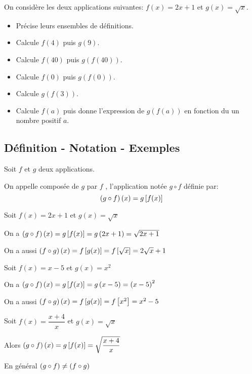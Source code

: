 


  
   \begin{lemma}
    On considère les deux applications suivantes: $ f(x)=2x+1 $  et  $ g(x)=\sqrt{x} $.
  \begin{itemize}
\item  Précise leurs ensembles de définitions.
 \item Calcule $ f(4) $  puis $ g(9) $.
 \item Calcule $ f(40) $  puis $ g(f(40)) $.
 \item Calcule $ f(0) $  puis $ g(f(0)) $.
 \item Calcule  $ g(f(3)) $.
 \item Calcule $ f(a) $  puis donne l'expression de $ g(f(a)) $  en fonction du  un nombre positif $ a $.
 \end{itemize}
 \end{lemma}
\subsection*{Définition - Notation - Exemples}

  \begin{definition}
  Soit $f $ et $g$  deux applications.
 
 On appelle composée de $ g $  par $ f $ , l'application notée $ g\circ f $ définie par:
  \[\left(g\circ f\right)(x)=g\left[ f(x) \right]\]
 \end{definition}
 
  \begin{example}
  Soit $ f(x)= 2x+1 $  et $ g(x)=\sqrt{x} $

 
 On a $ \left(g\circ f\right)(x)=g\left[ f(x) \right]= g\left(2x+1\right)=\sqrt{2x+1} $
 


  On a aussi $ \left(f\circ g\right)(x)=f\left[ g(x) \right]= f\left[ \sqrt{x} \right]=2\sqrt{x}+1 $
  \end{example}

  \begin{example}
 
 Soit $ f(x)= x-5 $  et $ g(x)=x^{2} $
 
 
 On a $ \left(g\circ f\right)(x)=g\left[ f(x) \right]= g\left(x-5\right)=\left(x-5\right)^{2} $
 


  On a aussi $ \left(f\circ g\right)(x)=f\left[ g(x) \right]= f\left[ x^{2} \right]=x^{2}-5 $
 \end{example}

 
 \begin{example}
 
 Soit $ f(x)= \dfrac{x+4}{x} $  et $ g(x)=\sqrt{x} $

Alors \;  $ \left(g\circ f\right)(x)=g\left[ f(x) \right]= \sqrt{\dfrac{x+4}{x}} $
  \end{example}
 
 \begin{remark}
  En général $ \left(g\circ f\right) \neq  \left(f\circ g\right)$
 \end{remark}
 

